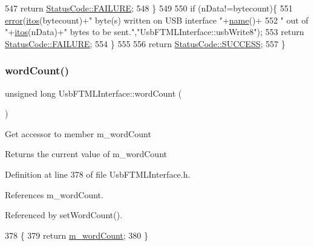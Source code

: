 \begin{DoxyCode}
547     \textcolor{keywordflow}{return} \hyperlink{classStatusCode_a6f565cbeadc76d14c72f047e5e85eb4ba3da73d4c469762eb9d3c960368252b26}{StatusCode::FAILURE};
548   \}
549 
550   \textcolor{keywordflow}{if} (nData!=bytecount)\{
551     \hyperlink{classObject_a204a95f57818c0f811933917a30eff45}{error}(\hyperlink{Tools_8h_af330027dbdafb9a30768b3613c553e60}{itos}(bytecount)+\textcolor{stringliteral}{" byte(s) written on USB interface "}+\hyperlink{classObject_a300f4c05dd468c7bb8b3c968868443c1}{name}()+
552             \textcolor{stringliteral}{" out of "}+\hyperlink{Tools_8h_af330027dbdafb9a30768b3613c553e60}{itos}(nData)+\textcolor{stringliteral}{" bytes to be sent."},\textcolor{stringliteral}{"UsbFTMLInterface::usbWrite8"});
553     \textcolor{keywordflow}{return} \hyperlink{classStatusCode_a6f565cbeadc76d14c72f047e5e85eb4ba3da73d4c469762eb9d3c960368252b26}{StatusCode::FAILURE};    
554   \}
555 
556   \textcolor{keywordflow}{return} \hyperlink{classStatusCode_a6f565cbeadc76d14c72f047e5e85eb4badd0da38d3ba0d922efd1f4619bc37ad8}{StatusCode::SUCCESS};  
557 \}
\end{DoxyCode}
\mbox{\label{classUsbFTMLInterface_a844ab72bfe0d3e14dd16f607a7c14905}} 
\subsubsection{\texorpdfstring{word\+Count()}{wordCount()}}
{\footnotesize\ttfamily unsigned long Usb\+F\+T\+M\+L\+Interface\+::word\+Count (\begin{DoxyParamCaption}{ }\end{DoxyParamCaption})\hspace{0.3cm}{\ttfamily [inline]}}

Get accessor to member m\+\_\+word\+Count \begin{DoxyReturn}{Returns}
the current value of m\+\_\+word\+Count 
\end{DoxyReturn}


Definition at line 378 of file Usb\+F\+T\+M\+L\+Interface.\+h.



References m\+\_\+word\+Count.



Referenced by set\+Word\+Count().


\begin{DoxyCode}
378                              \{
379     \textcolor{keywordflow}{return} \hyperlink{classUsbFTMLInterface_ab7f4399ef367c08ffe1f7034f133986e}{m\_wordCount};
380   \}
\end{DoxyCode}
\mbox{\label{classUsbFTMLInterface_ac313f412cbda6222ef817cb46083e2b3}} 
